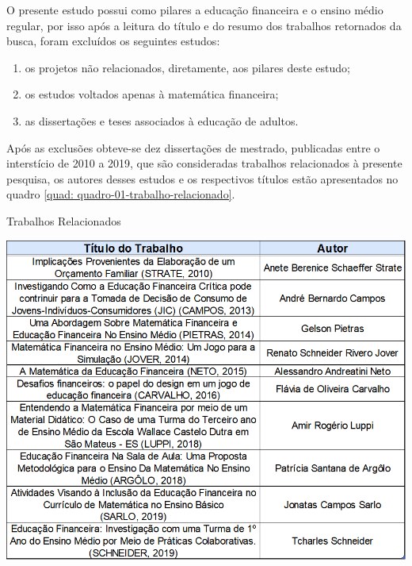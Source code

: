 O presente estudo possui como pilares a educação financeira e o ensino médio regular, por isso após a leitura do título e do resumo dos trabalhos retornados da busca, foram excluídos os seguintes estudos:

\begin{enumerate}
    \item os projetos não relacionados, diretamente, aos pilares deste estudo;
    \item os estudos voltados apenas à matemática financeira;
    \item as dissertações e teses associados à educação de adultos.
\end{enumerate}

Após as exclusões obteve-se dez dissertações de mestrado, publicadas entre o interstício de 2010 a 2019, que são consideradas trabalhos relacionados à presente pesquisa, os autores desses estudos e os respectivos títulos estão apresentados no quadro \ref{quad: quadro-01-trabalho-relacionado}.

\graphicspath{{quadros/}}
\begin{quadro}[!ht]
\centering
\begin{minipage}{1\textwidth}
\caption{Trabalhos Relacionados}
\centering
\includegraphics[width=1\textwidth]{quadro-01-trabalho-relacionado.png}
\label{quad: quadro-01-trabalho-relacionado}
\end{minipage}
\end{quadro}

